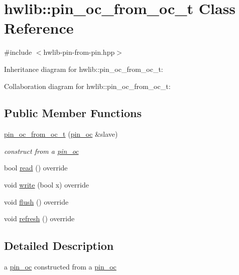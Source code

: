 \hypertarget{classhwlib_1_1pin__oc__from__oc__t}{}\section{hwlib\+:\+:pin\+\_\+oc\+\_\+from\+\_\+oc\+\_\+t Class Reference}
\label{classhwlib_1_1pin__oc__from__oc__t}


{\ttfamily \#include $<$hwlib-\/pin-\/from-\/pin.\+hpp$>$}



Inheritance diagram for hwlib\+:\+:pin\+\_\+oc\+\_\+from\+\_\+oc\+\_\+t\+:


Collaboration diagram for hwlib\+:\+:pin\+\_\+oc\+\_\+from\+\_\+oc\+\_\+t\+:
\subsection*{Public Member Functions}
\begin{DoxyCompactItemize}
\item 
\mbox{\label{classhwlib_1_1pin__oc__from__oc__t_aad6cd6dd82542c80cb1c7eae7a6c00d0}} 
\hyperlink{classhwlib_1_1pin__oc__from__oc__t_aad6cd6dd82542c80cb1c7eae7a6c00d0}{pin\+\_\+oc\+\_\+from\+\_\+oc\+\_\+t} (\hyperlink{classhwlib_1_1pin__oc}{pin\+\_\+oc} \&slave)
\begin{DoxyCompactList}\small\item\em construct from a \hyperlink{classhwlib_1_1pin__oc}{pin\+\_\+oc} \end{DoxyCompactList}\item 
bool \hyperlink{classhwlib_1_1pin__oc__from__oc__t_aa896dfa412fe5644e0096b38c739cd42}{read} () override
\item 
void \hyperlink{classhwlib_1_1pin__oc__from__oc__t_a0ada22e9e4452523de2b89b6b049c10b}{write} (bool x) override
\item 
void \hyperlink{classhwlib_1_1pin__oc__from__oc__t_a20b667326a27ae3156874fc308d4e795}{flush} () override
\item 
void \hyperlink{classhwlib_1_1pin__oc__from__oc__t_a2bdf7192ad976dab785df8874267420d}{refresh} () override
\end{DoxyCompactItemize}


\subsection{Detailed Description}
a \hyperlink{classhwlib_1_1pin__oc}{pin\+\_\+oc} constructed from a \hyperlink{classhwlib_1_1pin__oc}{pin\+\_\+oc}


